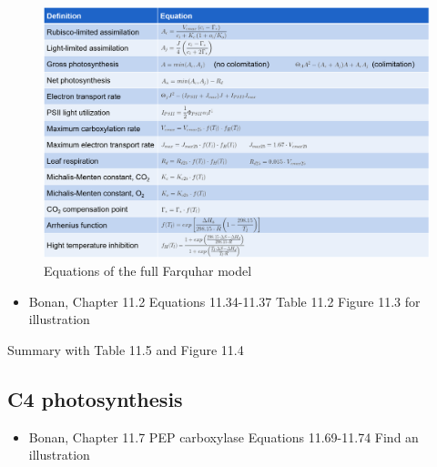 \documentclass[12pt,oneside]{book}
\providecommand{\tightlist}{%
  \setlength{\itemsep}{0pt}\setlength{\parskip}{0pt}}
\begin{document}
\begin{figure}

{\centering \includegraphics[width=0.8\linewidth]{figures/chap2/full_farquhar} 

}

\caption{Equations of the full Farquhar model}\label{fig:f210}
\end{figure}

\begin{itemize}
\tightlist
\item
  Bonan, Chapter 11.2 Equations 11.34-11.37 Table 11.2 Figure 11.3 for
  illustration
\end{itemize}

Summary with Table 11.5 and Figure 11.4

\subsection{C4 photosynthesis}\label{c4-photosynthesis}

\begin{itemize}
\tightlist
\item
  Bonan, Chapter 11.7 PEP carboxylase Equations 11.69-11.74 Find an
  illustration
\end{itemize}
\end{document}
